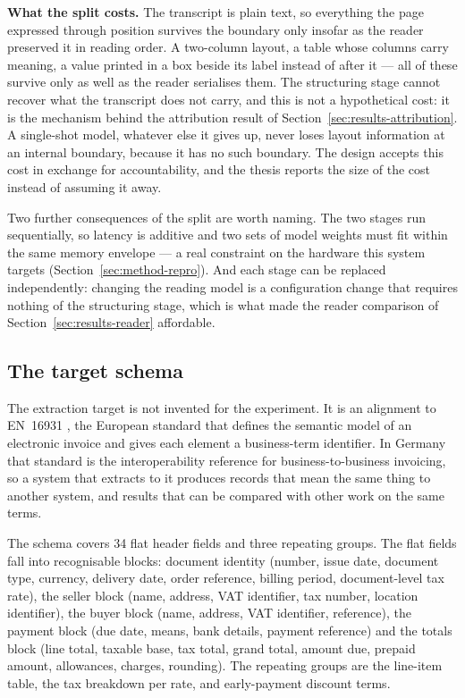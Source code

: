 \textbf{What the split costs.} The transcript is plain text, so
everything the page expressed through position survives the boundary only insofar as the
reader preserved it in reading order. A two-column layout, a table whose columns carry
meaning, a value printed in a box beside its label instead of after it --- all of these
survive only as well as the reader serialises them. The structuring stage cannot recover what
the transcript does not carry, and this is not a hypothetical cost: it is the mechanism behind
the attribution result of Section~\ref{sec:results-attribution}. A single-shot model, whatever else
it gives up, never loses layout information at an internal boundary, because it has no such
boundary. The design accepts this cost in exchange for accountability, and the thesis reports
the size of the cost instead of assuming it away.

Two further consequences of the split are worth naming. The two stages run sequentially, so
latency is additive and two sets of model weights must fit within the same memory envelope ---
a real constraint on the hardware this system targets (Section~\ref{sec:method-repro}). And each
stage can be replaced independently: changing the reading model is a configuration change that
requires nothing of the structuring stage, which is what made the reader comparison of
Section~\ref{sec:results-reader} affordable.

\subsection{The target schema}
\label{sec:design-schema}

The extraction target is not invented for the experiment. It is an alignment to
\ac{EN}~16931 \parencite{en16931}, the European standard that defines the semantic model of an
electronic invoice and gives each element a business-term identifier. In Germany that standard
is the interoperability reference for business-to-business invoicing, so a system that extracts
to it produces records that mean the same thing to another system, and results that can be
compared with other work on the same terms.

The schema covers 34 flat header fields and three repeating groups. The flat fields fall into
recognisable blocks: document identity (number, issue date, document type, currency, delivery
date, order reference, billing period, document-level tax rate), the seller block (name,
address, \ac{VAT} identifier, tax number, location identifier), the buyer block (name, address,
\ac{VAT} identifier, reference), the payment block (due date, means, bank details, payment
reference) and the totals
block (line total, taxable base, tax total, grand total, amount due, prepaid amount,
allowances, charges, rounding). The repeating groups are the line-item table, the tax breakdown
per rate, and early-payment discount terms.

